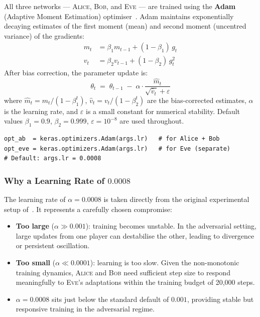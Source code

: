 \documentclass[12pt, a4paper]{article}
\newcommand{\alice}{\textsc{Alice}}
\newcommand{\bob}{\textsc{Bob}}
\newcommand{\eve}{\textsc{Eve}}
\newcommand{\code}[1]{\texttt{\color{CodeRed}#1}}
\begin{document}
All three networks — \alice{}, \bob{}, and \eve{} — are trained using the
\textbf{Adam} (Adaptive Moment Estimation) optimiser~\cite{kingma2014adam}.
Adam maintains exponentially decaying estimates of the first moment
(mean) and second moment (uncentred variance) of the gradients:
%
\begin{align}
  m_t &= \beta_1 m_{t-1} + (1-\beta_1)\, g_t
  \label{eq:adam_m} \\[4pt]
  v_t &= \beta_2 v_{t-1} + (1-\beta_2)\, g_t^2
  \label{eq:adam_v}
\end{align}
%
After bias correction, the parameter update is:
%
\begin{equation}
  \theta_t \;=\; \theta_{t-1}
  \;-\; \alpha \cdot
  \frac{\hat{m}_t}{\sqrt{\hat{v}_t} + \varepsilon}
  \label{eq:adam_update}
\end{equation}
%
where $\hat{m}_t = m_t / (1-\beta_1^t)$,
$\hat{v}_t = v_t / (1-\beta_2^t)$ are the bias-corrected estimates,
$\alpha$ is the learning rate, and $\varepsilon$ is a small constant for
numerical stability. Default values $\beta_1 = 0.9$, $\beta_2 = 0.999$,
$\varepsilon = 10^{-8}$ are used throughout.

\begin{lstlisting}[caption={Adam optimisers in \code{main\_enhanced.py}}]
opt_ab  = keras.optimizers.Adam(args.lr)   # for Alice + Bob
opt_eve = keras.optimizers.Adam(args.lr)   # for Eve (separate)
# Default: args.lr = 0.0008
\end{lstlisting}

\subsubsection*{Why a Learning Rate of $0.0008$}

The learning rate of $\alpha = 0.0008$ is taken directly from the
original experimental setup of~\cite{abadi2016learning}. It represents
a carefully chosen compromise:

\begin{itemize}[leftmargin=1.8em, itemsep=4pt]
  \item \textbf{Too large} ($\alpha \gg 0.001$): training becomes
        unstable. In the adversarial setting, large updates from one
        player can destabilise the other, leading to divergence or
        persistent oscillation.
  \item \textbf{Too small} ($\alpha \ll 0.0001$): learning is too slow.
        Given the non-monotonic training dynamics, \alice{} and \bob{}
        need sufficient step size to respond meaningfully to \eve{}'s
        adaptations within the training budget of 20{,}000 steps.
  \item $\alpha = 0.0008$ sits just below the standard default of
        $0.001$, providing stable but responsive training in the
        adversarial regime.
\end{itemize}
\end{document}
